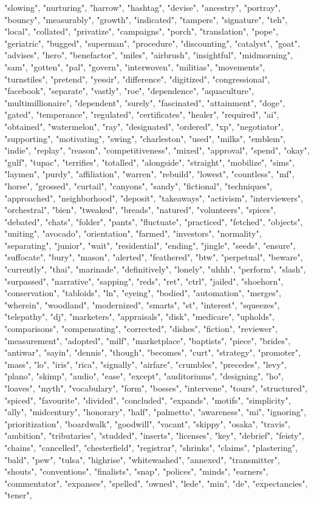 "slowing", "nurturing", "harrow", "hashtag", "devise", "ancestry", "portray", "bouncy", "measurably", "growth", "indicated", "tampers", "signature", "teh", "local", "collated", "privatize", "campaigns", "porch", "translation", "pope", "geriatric", "bugged", "superman", "procedure", "discounting", "catalyst", "goat", "advises", "hero", "benefactor", "miles", "airbrush", "insightful", "midmorning", "sam", "gotten", "pal", "govern", "interwoven", "militias", "movements", "turnstiles", "pretend", "yessir", "difference", "digitized", "congressional", "facebook", "separate", "vastly", "roe", "dependence", "aquaculture", "multimillionaire", "dependent", "surely", "fascinated", "attainment", "doge", "gated", "temperance", "regulated", "certificates", "healer", "required", "ai", "obtained", "watermelon", "ray", "designated", "ordered", "xp", "negotiator", "supporting", "motivating", "swing", "charleston", "used", "milks", "emblem", "indie", "replay", "reason", "competitiveness", "mixed", "approval", "spend", "okay", "gulf", "tupac", "terrifies", "totalled", "alongside", "straight", "mobilize", "sims", "laymen", "purdy", "affiliation", "warren", "rebuild", "lowest", "countless", "mf", "horse", "grossed", "curtail", "canyons", "sandy", "fictional", "techniques", "approached", "neighborhood", "deposit", "takeaways", "activism", "interviewers", "orchestral", "bien", "tweaked", "breads", "natured", "volunteers", "spices", "debated", "chats", "folder", "pants", "fluctuate", "practiced", "fetched", "objects", "uniting", "avocado", "orientation", "farmed", "investors", "normality", "separating", "junior", "wait", "residential", "ending", "jingle", "seeds", "ensure", "suffocate", "bury", "mason", "alerted", "feathered", "btw", "perpetual", "beware", "currently", "thai", "marinade", "definitively", "lonely", "uhhh", "perform", "slash", "surpassed", "narrative", "sapping", "reds", "ret", "ctrl", "jailed", "shoehorn", "conservation", "tabloids", "ln", "eyeing", "bodied", "automation", "merges", "wherein", "woodland", "modernized", "smarts", "st", "interest", "squeezes", "telepathy", "dj", "marketers", "appraisals", "disk", "medicare", "upholds", "comparisons", "compensating", "corrected", "dishes", "fiction", "reviewer", "measurement", "adopted", "milf", "marketplace", "baptists", "piece", "brides", "antiwar", "sayin", "dennis", "though", "becomes", "curt", "strategy", "promoter", "mass", "lo", "iris", "rica", "signally", "airfare", "crumbles", "precedes", "levy", "plano", "skimp", "audio", "ease", "except", "auditoriums", "designing", "ho", "loaves", "myth", "vocabulary", "form", "bosses", "intervene", "tours", "structured", "spiced", "favourite", "divided", "concluded", "expands", "motifs", "simplicity", "ally", "midcentury", "honorary", "half", "palmetto", "awareness", "mi", "ignoring", "prioritization", "boardwalk", "goodwill", "vacant", "skippy", "osaka", "travis", "ambition", "tributaries", "studded", "inserts", "licenses", "key", "debrief", "feisty", "chains", "cancelled", "chesterfield", "registrar", "shrinks", "claims", "plastering", "bald", "pew", "tulsa", "highrise", "whitewashed", "annexed", "transmitter", "shouts", "conventions", "finalists", "snap", "polices", "minds", "earners", "commentator", "expanses", "spelled", "owned", "lede", "min", "de", "expectancies", "tener", 